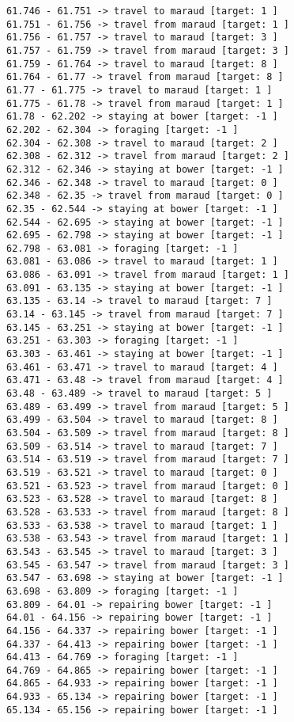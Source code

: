 \documentclass[11pt]{article}
\begin{document}
\begin{Verbatim}[commandchars=\\\{\}]
61.746 - 61.751 -> travel to maraud [target: 1 ]
61.751 - 61.756 -> travel from maraud [target: 1 ]
61.756 - 61.757 -> travel to maraud [target: 3 ]
61.757 - 61.759 -> travel from maraud [target: 3 ]
61.759 - 61.764 -> travel to maraud [target: 8 ]
61.764 - 61.77 -> travel from maraud [target: 8 ]
61.77 - 61.775 -> travel to maraud [target: 1 ]
61.775 - 61.78 -> travel from maraud [target: 1 ]
61.78 - 62.202 -> staying at bower [target: -1 ]
62.202 - 62.304 -> foraging [target: -1 ]
62.304 - 62.308 -> travel to maraud [target: 2 ]
62.308 - 62.312 -> travel from maraud [target: 2 ]
62.312 - 62.346 -> staying at bower [target: -1 ]
62.346 - 62.348 -> travel to maraud [target: 0 ]
62.348 - 62.35 -> travel from maraud [target: 0 ]
62.35 - 62.544 -> staying at bower [target: -1 ]
62.544 - 62.695 -> staying at bower [target: -1 ]
62.695 - 62.798 -> staying at bower [target: -1 ]
62.798 - 63.081 -> foraging [target: -1 ]
63.081 - 63.086 -> travel to maraud [target: 1 ]
63.086 - 63.091 -> travel from maraud [target: 1 ]
63.091 - 63.135 -> staying at bower [target: -1 ]
63.135 - 63.14 -> travel to maraud [target: 7 ]
63.14 - 63.145 -> travel from maraud [target: 7 ]
63.145 - 63.251 -> staying at bower [target: -1 ]
63.251 - 63.303 -> foraging [target: -1 ]
63.303 - 63.461 -> staying at bower [target: -1 ]
63.461 - 63.471 -> travel to maraud [target: 4 ]
63.471 - 63.48 -> travel from maraud [target: 4 ]
63.48 - 63.489 -> travel to maraud [target: 5 ]
63.489 - 63.499 -> travel from maraud [target: 5 ]
63.499 - 63.504 -> travel to maraud [target: 8 ]
63.504 - 63.509 -> travel from maraud [target: 8 ]
63.509 - 63.514 -> travel to maraud [target: 7 ]
63.514 - 63.519 -> travel from maraud [target: 7 ]
63.519 - 63.521 -> travel to maraud [target: 0 ]
63.521 - 63.523 -> travel from maraud [target: 0 ]
63.523 - 63.528 -> travel to maraud [target: 8 ]
63.528 - 63.533 -> travel from maraud [target: 8 ]
63.533 - 63.538 -> travel to maraud [target: 1 ]
63.538 - 63.543 -> travel from maraud [target: 1 ]
63.543 - 63.545 -> travel to maraud [target: 3 ]
63.545 - 63.547 -> travel from maraud [target: 3 ]
63.547 - 63.698 -> staying at bower [target: -1 ]
63.698 - 63.809 -> foraging [target: -1 ]
63.809 - 64.01 -> repairing bower [target: -1 ]
64.01 - 64.156 -> repairing bower [target: -1 ]
64.156 - 64.337 -> repairing bower [target: -1 ]
64.337 - 64.413 -> repairing bower [target: -1 ]
64.413 - 64.769 -> foraging [target: -1 ]
64.769 - 64.865 -> repairing bower [target: -1 ]
64.865 - 64.933 -> repairing bower [target: -1 ]
64.933 - 65.134 -> repairing bower [target: -1 ]
65.134 - 65.156 -> repairing bower [target: -1 ]

\end{Verbatim}
\end{document}
